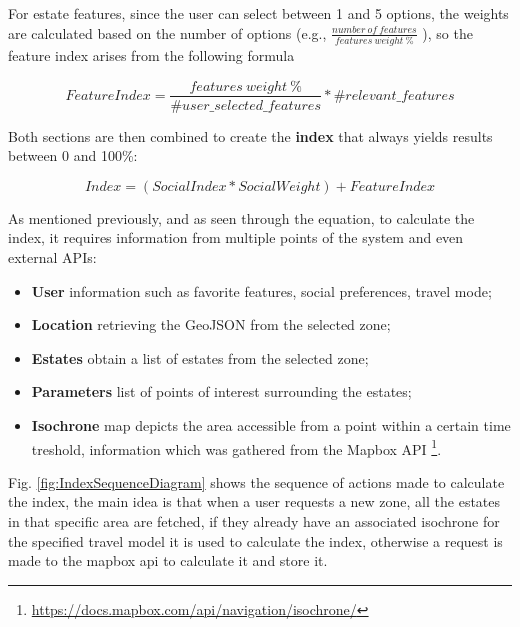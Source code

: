 For estate features, since the user can select between 1 and 5 options, the weights are calculated based on the number of options (e.g., $\frac{number \ of \ features}{features \ weight \ \%}$ ), so the feature index arises from the following formula

\begin{equation}
    FeatureIndex = \frac{features \ weight \ \%}{\#user\_selected\_features} * \#relevant\_features
\end{equation}

Both sections are then combined to create the \textbf{index} that always yields results between 0 and 100\%:

\begin{equation}
    Index = (SocialIndex * SocialWeight) + FeatureIndex
\end{equation}

As mentioned previously, and as seen through the equation, to calculate the index, it requires information from multiple points of the system and even external APIs:

\begin{itemize}
    \item \textbf{User} information such as favorite features, social preferences, travel mode;
    \item \textbf{Location} retrieving the GeoJSON from the selected zone;
    \item \textbf{Estates} obtain a list of estates from the selected zone;
    \item \textbf{Parameters} list of points of interest surrounding the estates;
    \item \textbf{Isochrone} map depicts the area accessible from a point within a certain time treshold, information which was gathered from the Mapbox API \footnote{\url{https://docs.mapbox.com/api/navigation/isochrone/}}.
\end{itemize}

Fig. \ref{fig:IndexSequenceDiagram} shows the sequence of actions made to calculate the index, the main idea is that when a user requests a new zone, all the estates in that specific area are fetched, if they already have an associated isochrone for the specified travel model it is used to calculate the index, otherwise a request is made to the mapbox \acrshort{api} to calculate it and store it.


